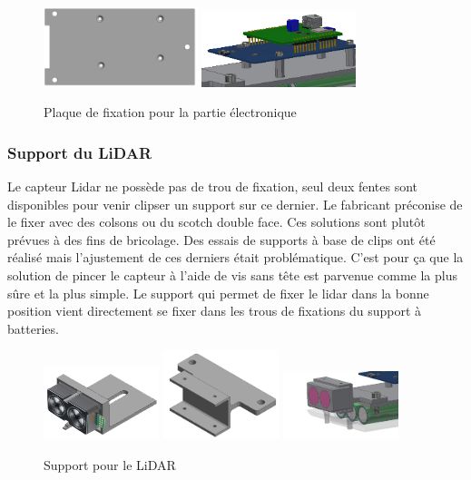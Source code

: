 \begin{figure}[H]
    \centering
    \includegraphics[width=0.4\textwidth]{Images/photos_PGA/plaquesmodule.PNG}
    \includegraphics[width=0.4\textwidth]{Images/photos_PGA/PCB.PNG}
    \caption{Plaque de fixation pour la partie électronique}
    \label{fig:fixelectronique}
\end{figure}

\subsubsection{Support du LiDAR}

Le capteur Lidar ne possède pas de trou de fixation, seul deux fentes sont disponibles pour venir 
clipser un support sur ce dernier. Le fabricant préconise de le fixer avec des colsons ou du scotch 
double face. Ces solutions sont plutôt prévues à des fins de bricolage. Des essais de supports à base 
de clips ont été réalisé mais l’ajustement de ces derniers était problématique. C’est pour ça que la 
solution de pincer le capteur à l’aide de vis sans tête est parvenue comme la plus sûre et la plus simple. 
Le support qui permet de fixer le lidar dans la bonne position vient directement se fixer dans les 
trous de fixations du support à batteries.

\begin{figure}[H]
    \centering
    \includegraphics[width=0.3\textwidth]{Images/photos_PGA/lidar dans support.png}
    \includegraphics[width=0.3\textwidth]{Images/photos_PGA/supportLidar2.PNG}
    \includegraphics[width=0.3\textwidth]{Images/photos_PGA/supportlidar.PNG}
    \caption{Support pour le LiDAR}
    \label{fig:supportlidar}
\end{figure}


